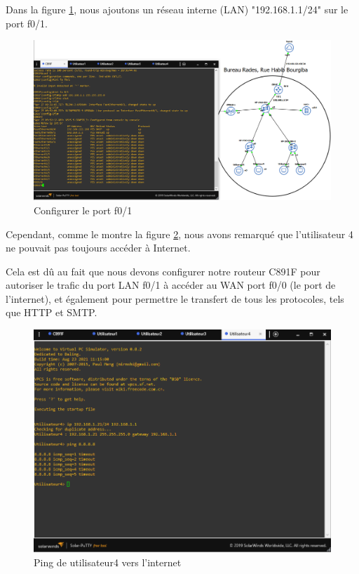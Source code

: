 Dans la figure \ref{Chap2.2.4}, nous ajoutons un réseau interne (LAN) "192.168.1.1/24" sur le port f0/1. 

\begin{figure}[H]
 \centering
    \includegraphics[width=16cm]{Images/BRades-Topologie4.png}
    \caption{Configurer le port f0/1}
    \label{Chap2.2.4}
\end{figure}

Cependant, comme le montre la figure \ref{Chap2.2.5}, nous avons remarqué que l'utilisateur 4 ne pouvait pas toujours accéder à Internet. 

Cela est dû au fait que nous devons configurer notre routeur C891F pour autoriser le trafic du port LAN f0/1 à accéder au WAN port f0/0 (le port de l'internet), et également pour permettre le transfert de tous les protocoles, tels que HTTP et SMTP.




\begin{figure}[H]
 \centering
    \includegraphics[width=16cm]{Images/BRades-Topologie5.png}
    \caption{Ping de utilisateur4 vers l'internet}
    \label{Chap2.2.5}
\end{figure}


